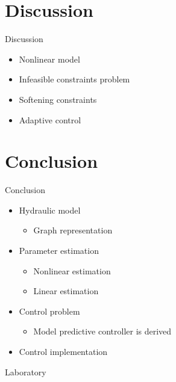 \section{Discussion}


\begin{frame}{Discussion}{}

\begin{itemize}
\item<1-> Nonlinear model 
\item<1-> Infeasible constraints problem
\item<1-> Softening constraints 
\item<1-> Adaptive control 

\end{itemize}

\end{frame}


\section{Conclusion}


\begin{frame}{Conclusion}{}


\begin{itemize}
\item<1-> Hydraulic model 
\begin{itemize}
\item Graph representation
\end{itemize}

\item<1-> Parameter estimation 
\begin{itemize}
\item Nonlinear estimation
\item Linear estimation
\end{itemize}

\item<1-> Control problem
\begin{itemize}
\item Model predictive controller is derived
\end{itemize}

\item<1-> Control implementation
\end{itemize}

\end{frame}





\begin{frame}{Laboratory}{}
\end{frame}